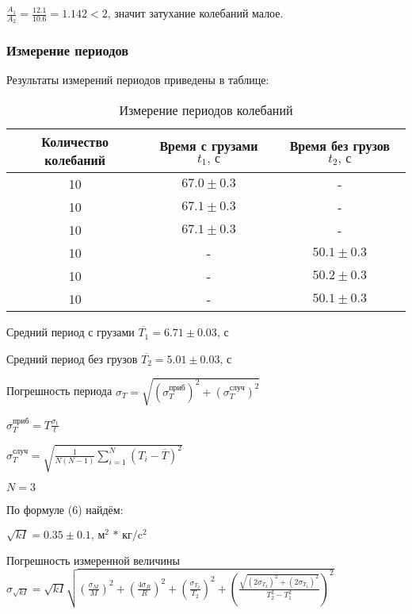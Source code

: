 \documentclass[a4paper]{article}
\begin{document}
\item $\frac{A_1}{A_2} = \frac{12.1}{10.6} = 1.142 < 2$, значит затухание колебаний малое.

\subsubsection{Измерение периодов}

Результаты измерений периодов приведены в таблице:

\begin{table}[h!]
\centering
\caption{Измерение периодов колебаний}
\begin{tabular}{|c|c|c|}
\hline
Количество колебаний & Время с грузами $t_1\text{, с}$  & Время без грузов $t_2\text{, с}$ \\ \hline
10  & $67.0\pm {0.3}$ & - \\ \hline
10  & $67.1\pm {0.3}$ & - \\ \hline
10  & $67.1\pm {0.3}$ & - \\ \hline
10  & - & $50.1\pm {0.3}$ \\ \hline
10  & - & $50.2\pm {0.3}$ \\ \hline
10  & - & $50.1\pm {0.3}$ \\ \hline


\end{tabular}
\end{table}

\item Средний период с грузами $\overline{T_1} = 6.71 \pm{0.03} \text{, с}$

\item Средний период без грузов $\overline{T_2} = 5.01 \pm{0.03} \text{, с}$

\item Погрешность периода $\sigma_T = \sqrt{(\sigma_T^{\text{приб}})^2 + (\sigma_T^{\text{случ}})^2}$

\item $\sigma_T^{\text{приб}} = T \frac{\sigma_t}{t}$

\item $\sigma_T^{\text{случ}} = \sqrt{\frac{1}{N(N-1)} \sum_{i = 1}^{N} (T_i - \overline{T})^2}$

\item $N = 3$

По формуле (6) найдём:

\item $\sqrt{kI} = 0.35 \pm{0.1} \text{, м$^2$ * кг/c$^2$}$

\item Погрешность измеренной величины $\sigma_{\sqrt{kI}} = \sqrt{kI} \sqrt{(\frac{\sigma_M}{M})^2 + (\frac{4\sigma_R}{R})^2 + (\frac{\sigma_{T_2}}{T_2})^2 + (\frac{\sqrt{(2\sigma_{T_2})^2+(2\sigma_{T_1})^2}}{T_2^2 - T_1^2})^2}$
\end{document}
